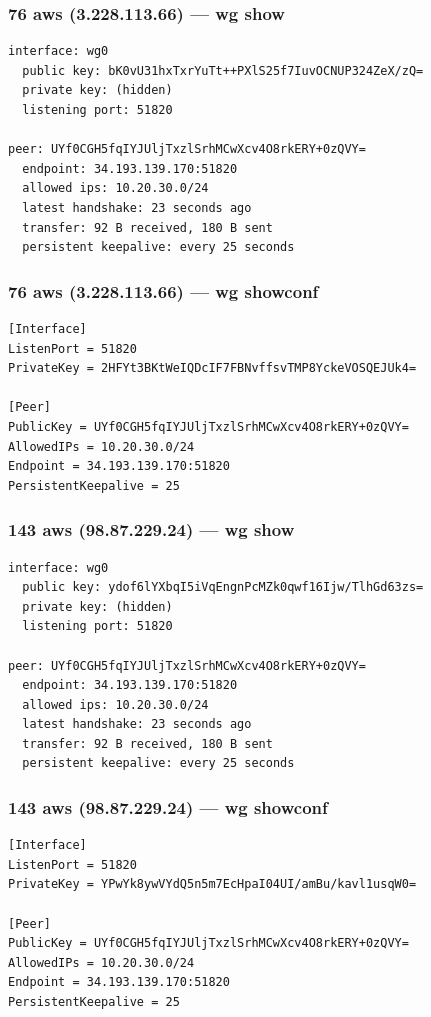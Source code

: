 \documentclass[11pt,a4paper]{article}
\begin{document}
\subsubsection*{76 aws (3.228.113.66) — wg show}
\begin{lstlisting}
interface: wg0
  public key: bK0vU31hxTxrYuTt++PXlS25f7IuvOCNUP324ZeX/zQ=
  private key: (hidden)
  listening port: 51820

peer: UYf0CGH5fqIYJUljTxzlSrhMCwXcv4O8rkERY+0zQVY=
  endpoint: 34.193.139.170:51820
  allowed ips: 10.20.30.0/24
  latest handshake: 23 seconds ago
  transfer: 92 B received, 180 B sent
  persistent keepalive: every 25 seconds

\end{lstlisting}

\subsubsection*{76 aws (3.228.113.66) — wg showconf}
\begin{lstlisting}
[Interface]
ListenPort = 51820
PrivateKey = 2HFYt3BKtWeIQDcIF7FBNvffsvTMP8YckeVOSQEJUk4=

[Peer]
PublicKey = UYf0CGH5fqIYJUljTxzlSrhMCwXcv4O8rkERY+0zQVY=
AllowedIPs = 10.20.30.0/24
Endpoint = 34.193.139.170:51820
PersistentKeepalive = 25

\end{lstlisting}

\subsubsection*{143 aws (98.87.229.24) — wg show}
\begin{lstlisting}
interface: wg0
  public key: ydof6lYXbqI5iVqEngnPcMZk0qwf16Ijw/TlhGd63zs=
  private key: (hidden)
  listening port: 51820

peer: UYf0CGH5fqIYJUljTxzlSrhMCwXcv4O8rkERY+0zQVY=
  endpoint: 34.193.139.170:51820
  allowed ips: 10.20.30.0/24
  latest handshake: 23 seconds ago
  transfer: 92 B received, 180 B sent
  persistent keepalive: every 25 seconds

\end{lstlisting}

\subsubsection*{143 aws (98.87.229.24) — wg showconf}
\begin{lstlisting}
[Interface]
ListenPort = 51820
PrivateKey = YPwYk8ywVYdQ5n5m7EcHpaI04UI/amBu/kavl1usqW0=

[Peer]
PublicKey = UYf0CGH5fqIYJUljTxzlSrhMCwXcv4O8rkERY+0zQVY=
AllowedIPs = 10.20.30.0/24
Endpoint = 34.193.139.170:51820
PersistentKeepalive = 25

\end{lstlisting}
\end{document}
